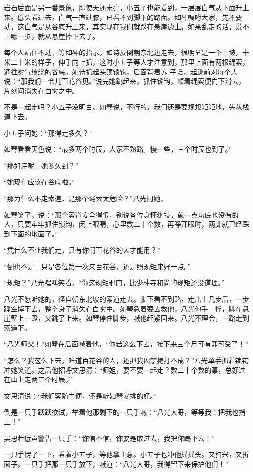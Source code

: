 岩石后面是另一番景象，即使天还未亮，小五子也能看到，一层层白气从下面升上来。低头看过去，白气一直过膝，已看不到脚下的路面。如琴嘱咐大家，先不要动，这白气是从谷底升上来，其实现在我们就踩在悬崖边上，如果乱走的话，说不上哪一步，就从悬崖掉下去了。

每个人站住不动，等如琴的指示。如诗反倒朝东北边走去，很明显是一个上坡，十米二十米的样子，伸手向上抓，这时小五子等人才注意到，那里上面有两根绳索，通往雾气缭绕的谷底。如诗抓起头顶锁钩，后面背着苏
子瑶，起跳前对每个人说：“那我们一会儿百花谷见。”说完她跳起来，抓住锁钩，顺着绳索便向下滑去，片刻间消失在白雾之中。

不是一起走吗？小五子没明白。如琴说，不行的，我们还是要规规矩矩地，先从栈道下去。

小五子问她：“那得走多久？”

如琴看看天色说：“最多两个时辰，大家不熟路，慢一些，三个时辰也到了。”

“那如诗呢，她多久到？”

“她现在应该在谷底啦。”

“那为什么不走索道，是那个绳索太危险？”八光问她。

如琴笑了，说：“那个索道安全得很，别说各位身怀绝技，就一点功底也没有的人，只要牢牢抓住锁钩，闭上眼睛，心里数二十个数，再睁开眼时，两脚就已经踩到下面的地面了。”

“凭什么不让我们走，只有你们百花谷的人才能用？”

“倒也不是，只是各位第一次来百花谷，还是照规矩来好一点。”

“规矩？”八光嘿嘿笑着，“你这规矩邪门，比少林寺和尚的规矩还没道理。”

八光不愿听她的，径自朝东北坡的索道走去。脚下看不到路，走出十几步后，一步踩空掉下去，整个身子消失在白雾中。如琴急着要去救他，八光伸手一撑，脚在悬崖壁上一蹬，又跳了上来。如琴停住脚步，喊他赶紧回来。八光不理会，一路走到索道下。

“八光师父！”如琴在后面喊着他，“你若这么下去，接下来三个月可有罪可受了！”

“怎么？我这么下去，难道百花谷的人，还把我囚禁拷打不成？”八光单手抓着锁钩冲她笑道。之后他招呼文思清：“师姐，要不要一起走？数二十个数的事，总好过在山上走两三个时辰。”

文思清说：“我们客随主便，还是听如琴安排的好。”

倒是一只手跃跃欲试，举着他那剩下的一只手喊：“八光大哥，等等我！把我也捎上！”

吴思若低声警告一只手：“你信不信，你要是敢过去，我把你踢下去！”

一只手愣了一下，看着小五子，等他拿主意。小五子也冲他摇摇头。又扫兴，又折面子。一只手把那一只手放下，喊道：“八光大哥，我得留下来保护他们！”

